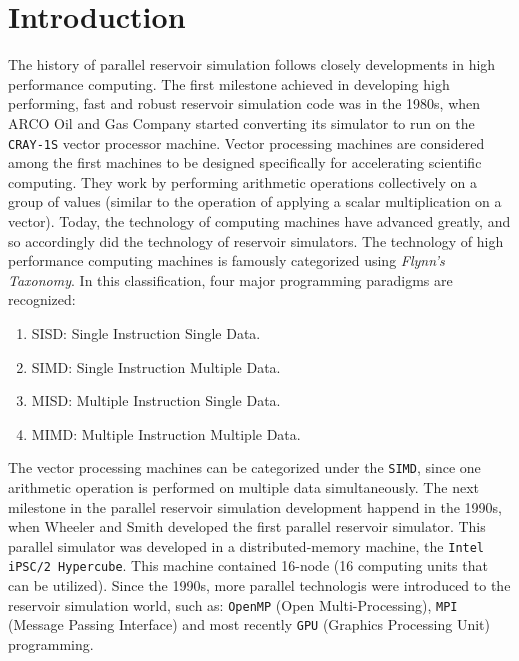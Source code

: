 \documentclass[barcolor=BrickRed,nocopyright,nolists]{asmejour}
\begin{document}
\section{Introduction}
The history of parallel reservoir simulation follows closely developments in high performance computing. The first milestone achieved in developing high performing, fast and robust reservoir simulation code was in the 1980s, when ARCO Oil and Gas Company started
converting its simulator to run on the \texttt{CRAY-1S} vector processor machine\cite{spe10521}. Vector processing machines are considered among the first machines to be designed specifically for accelerating scientific computing. They work by performing arithmetic 
operations collectively on a group of values (similar to the operation of applying a scalar multiplication on a vector). Today, the technology of computing machines have advanced greatly, and so accordingly did the technology of reservoir simulators.
The technology of high performance computing machines is famously categorized using \textit{Flynn's Taxonomy}. In this classification, four major programming paradigms are recognized\cite{spe16020}:
\begin{enumerate}
	\item SISD: Single Instruction Single Data.
	\item SIMD: Single Instruction Multiple Data.
	\item MISD: Multiple Instruction Single Data.
	\item MIMD: Multiple Instruction Multiple Data.
\end{enumerate}
The vector processing machines can be categorized under the \texttt{SIMD}, since one arithmetic operation is performed on multiple data simultaneously.
The next milestone in the parallel reservoir simulation development happend in the 1990s, when Wheeler and Smith\cite{spe19804} developed the first parallel reservoir simulator.
This parallel simulator was developed in a distributed-memory machine, the \texttt{Intel iPSC/2 Hypercube}. This machine contained 16-node (16 computing units that can be utilized).
Since the 1990s, more parallel technologis were introduced to the reservoir simulation world, such as: \texttt{OpenMP} (Open Multi-Processing), \texttt{MPI} (Message Passing Interface) and most recently \texttt{GPU} (Graphics Processing Unit) programming.
\end{document}

